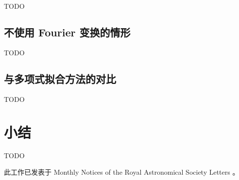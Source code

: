 TODO

\subsection{不使用 Fourier 变换的情形}

TODO

\subsection{与多项式拟合方法的对比}

TODO


\section{小结}

TODO

此工作已发表于 Monthly Notices of the Royal Astronomical Society
Letters \cite{li2018cdae}。


